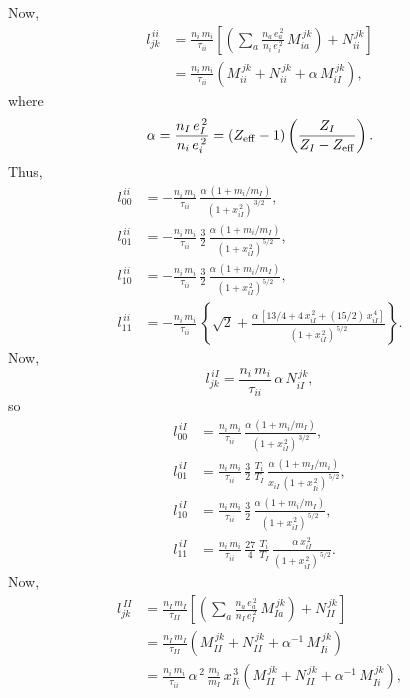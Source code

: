 \documentclass[12pt]{article}
\begin{document}
Now,
\begin{align}
l_{jk}^{\,ii} & = \frac{n_i\,m_i}{\tau_{ii}}\left[\left(\sum_a \frac{n_a\,e_a^{\,2}}{n_i\,e_i^{\,2}}\,M_{ia}^{\,jk}\right) + N_{ii}^{\,jk}\right]\\[0.5ex]
&= \frac{n_i\,m_i}{\tau_{ii}}\left(M_{ii}^{\,jk}+N_{ii}^{\,jk}+\alpha\,M_{iI}^{\,jk}\right),
\end{align}
where 
\begin{equation}
\alpha= \frac{n_I\,e_I^{\,2}}{n_i\,e_i^{\,2}}= (Z_{\rm eff}-1)\left(\frac{Z_I}{Z_I-Z_{\rm eff}}\right).
\end{equation}
Thus,
\begin{align}
l^{\,ii}_{00} &= -\frac{n_i\,m_i}{\tau_{ii}}\,\frac{\alpha\,(1+m_i/m_I)}{(1+x_{iI}^{\,2})^{\,3/2}},\\[0.5ex]
l^{\,ii}_{01}&= -\frac{n_i\,m_i}{\tau_{ii}}\,\frac{3}{2}\,\frac{\alpha\,(1+m_i/m_I)}{(1+x_{iI}^{\,2})^{5/2}},\\[0.5ex]
l^{\,ii}_{10}&= -\frac{n_i\,m_i}{\tau_{ii}}\,\frac{3}{2}\,\frac{\alpha\,(1+m_i/m_I)}{(1+x_{iI}^{\,2})^{5/2}},\\[0.5ex]
l^{\,ii}_{11}& = -\frac{n_i\,m_i}{\tau_{ii}}\,\left\{\sqrt{2}+ \frac{\alpha\,[13/4+4\,x_{iI}^{\,2}+(15/2)\,x_{iI}^{\,4}]}{(1+x_{iI}^{\,2})^{\,5/2}}\right\}.
\end{align}
Now,
\begin{equation}
l_{jk}^{\,iI} = \frac{n_i\,m_i}{\tau_{ii}}\,\alpha\,N_{iI}^{\,jk},
\end{equation}
so 
\begin{align}
l^{\,iI}_{00} &= \frac{n_i\,m_i}{\tau_{ii}}\,\frac{\alpha\,(1+m_i/m_I)}{(1+x_{iI}^{\,2})^{\,3/2}},\\[0.5ex]
l^{\,iI}_{01}&= \frac{n_i\,m_i}{\tau_{ii}}\,\frac{3}{2}\,\frac{T_i}{T_I}\,\frac{\alpha\,(1+m_I/m_i)}{x_{iI}\,(1+x_{Ii}^{\,2})^{\,5/2}},\\[0.5ex]
l^{\,iI}_{10}&= \frac{n_i\,m_i}{\tau_{ii}}\,\frac{3}{2}\,\frac{\alpha\,(1+m_i/m_I)}{(1+x_{iI}^{\,2})^{\,5/2}},\\[0.5ex]
l^{\,iI}_{11}& = \frac{n_i\,m_i}{\tau_{ii}}\,\frac{27}{4}\,\frac{T_i}{T_I}\,\frac{\alpha\,x_{iI}^{\,2}}{(1+x_{iI}^{\,2})^{\,5/2}}.
\end{align}
Now,
\begin{align}
l_{jk}^{\,II} & = \frac{n_I\,m_I}{\tau_{II}}\left[\left(\sum_a \frac{n_a\,e_a^{\,2}}{n_I\,e_I^{\,2}}\,M_{Ia}^{\,jk}\right) + N_{II}^{\,jk}\right]\\[0.5ex]
&=\frac{n_I\,m_I}{\tau_{II}}\left(M_{II}^{\,jk}+N_{II}^{\,jk}+\alpha^{-1}\,M_{Ii}^{\,jk}\right)\nonumber\\[0.5ex]
&= \frac{n_i\,m_i}{\tau_{ii}}\,\alpha^{\,2}\,\frac{m_i}{m_I}\,x_{Ii}^{\,3}\left(M_{II}^{\,jk}+N_{II}^{\,jk}+\alpha^{-1}\,M_{Ii}^{\,jk}\right),
\end{align}
\end{document}
